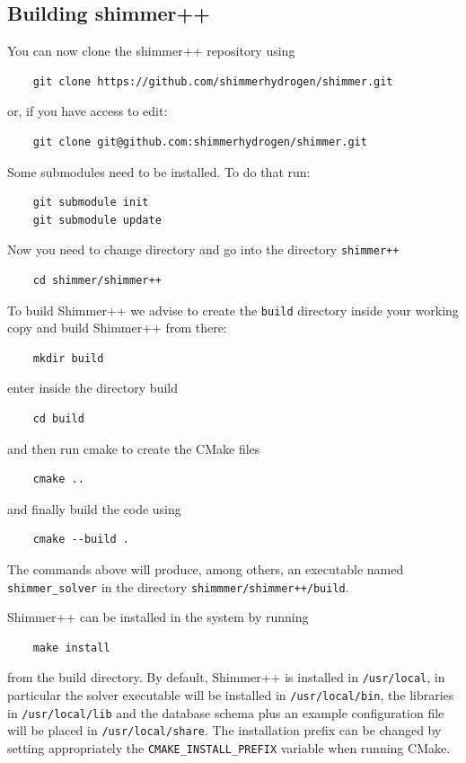 \subsection{Building shimmer++}
You can now clone the shimmer++ repository using
\begin{verbatim}        
    git clone https://github.com/shimmerhydrogen/shimmer.git
\end{verbatim}
or, if you have access to edit:
\begin{verbatim}
    git clone git@github.com:shimmerhydrogen/shimmer.git
\end{verbatim}
Some submodules need to be installed. To do that run:
\begin{verbatim}        
    git submodule init
    git submodule update
\end{verbatim}
Now you need to change directory and go into the directory \texttt{shimmer++}

\begin{verbatim}
    cd shimmer/shimmer++
\end{verbatim}

To build Shimmer++ we advise to create the \texttt{build} directory inside your working copy and build Shimmer++ from there:
\begin{verbatim}
    mkdir build
\end{verbatim}
enter inside the directory build
\begin{verbatim}
    cd build
\end{verbatim}
and then run cmake to create the CMake files
\begin{verbatim}
    cmake ..
\end{verbatim}
and finally build the code using
\begin{verbatim}
    cmake --build .
\end{verbatim}

The commands above will produce, among others, an executable named \texttt{shimmer\_solver} in the directory \texttt{shimmmer/shimmer++/build}.

Shimmer++ can be installed in the system by running
\begin{verbatim}
    make install
\end{verbatim}
from the build directory. By default, Shimmer++ is installed in \texttt{/usr/local}, in particular the solver executable will be installed in \texttt{/usr/local/bin}, the libraries in \texttt{/usr/local/lib} and the database schema plus an example configuration file will be placed in \texttt{/usr/local/share}. The installation prefix can be changed by setting appropriately the \texttt{CMAKE\_INSTALL\_PREFIX} variable when running CMake.

